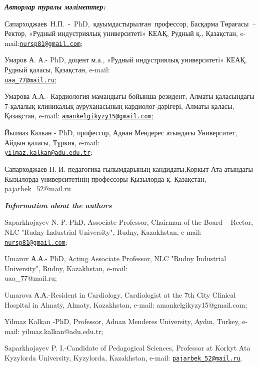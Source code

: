 \begin{authorinfo}
\emph{{\bfseries Авторлар туралы мәліметтер:}}

Сапарходжаев~Н.П.~-~PhD,~қауымдастырылған~профессор, Басқарма
Төрағасы~-- Ректор, «Рудный индустриялық университеті» КЕАҚ, Рудный қ.,
Қазақстан,
e-mail:\href{mailto:nursp81@gmail.com}{\nolinkurl{nursp81@gmail.com}};

Умаров А. А.- PhD, доцент м.а., «Рудный индустриялық университеті» КЕАҚ,
Рудный қаласы, Қазақстан, e-mail:\\
\href{mailto:uaa_77@mail.ru}{\nolinkurl{uaa\_77@mail.ru}};

Умарова А.А.- Кардиология мамандығы бойынша резидент, Алматы қаласындағы
7-қалалық клиникалық ауруханасының кардиолог-дәрігері, Алматы қаласы,
Қазақстан, e-mail:
\href{mailto:amankelgikyzy15@gmail.com}{\nolinkurl{amankelgikyzy15@gmail.com}};

Йылмаз Калкан - PhD, профессор, Аднан Мендерес атындағы Университет,
Айдын қаласы, Түркия, e-mail:\\
\href{mailto:yilmaz.kalkan@adu.edu.tr}{\nolinkurl{yilmaz.kalkan@adu.edu.tr}};

Сапарходжаев П. И.-педагогика ғылымдарының кандидаты,Коркыт Ата атындағы
Кызылорда университетінің профессоры Қызылорда қ. Қазақстан,
pajarbek\_52@mail.ru

\emph{{\bfseries Information about the authors}}

Saparkhojayev N. P.-PhD, Associate Professor, Chairman of the Board --
Rector, NLC "Rudny Industrial University", Rudny, Kazakhstan, e-mail:
\href{mailto:nursp81@gmail.com}{\nolinkurl{nursp81@gmail.com}};

Umarov А.А.- PhD, Acting Associate Professor, NLC "Rudny Industrial
University", Rudny, Kazakhstan, e-mail: \\uaa\_77@mail.ru;

Umarova А.А.-Resident in Cardiology, Cardiologist at the 7th City
Clinical Hospital in Almaty, Almaty, Kazakhstan, e-mail:
amankelgikyzy15@gmail.com;

Yilmaz Kalkan -PhD, Professor, Adnan Menderes University, Aydın, Turkey,
e-mail: yilmaz.kalkan@adu.edu.tr;

Saparkhojayev P. I.-Candidate of Pedagogical Sciences, Professor at
Korkyt Ata Kyzylorda University, Kyzylorda, Kazakhstan, e-mail:
\href{mailto:pajarbek_52@mail.ru}{\nolinkurl{pajarbek\_52@mail.ru}}.
\end{authorinfo}
